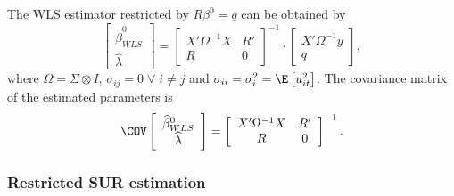 The WLS estimator restricted by $R \beta^0 = q$ can be obtained by
\begin{equation}
   \left[ \begin{array}{c}
      \widehat{\beta}^0_{WLS} \\ \widehat{\lambda}
   \end{array} \right]
   =
   \left[ \begin{array}{cc}
      X' \Omega^{-1} X & R' \\ 
      R & 0
   \end{array} \right]^{-1}
   \cdot
   \left[ \begin{array}{c}
      X' \Omega^{-1} y \\ q 
   \end{array} \right] ,
\end{equation}
where $\Omega = \Sigma \otimes I$,
$\sigma_{ij} = 0 \; \forall \; i \neq j$ and
$\sigma_{ii} = \sigma_i^2 = \E \left[ u_{it}^2 \right]$.
The covariance matrix of the estimated parameters is
\begin{equation}
   \COV
   \left[ \begin{array}{c}
      \widehat{\beta}^0_{WLS} \\ \widehat{\lambda}
   \end{array} \right] 
   = 
   \left[ \begin{array}{cc}
      X' \Omega^{-1} X & R' \\ 
      R & 0
   \end{array} \right]^{-1} .
\end{equation}

\subsubsection{Restricted SUR estimation}

